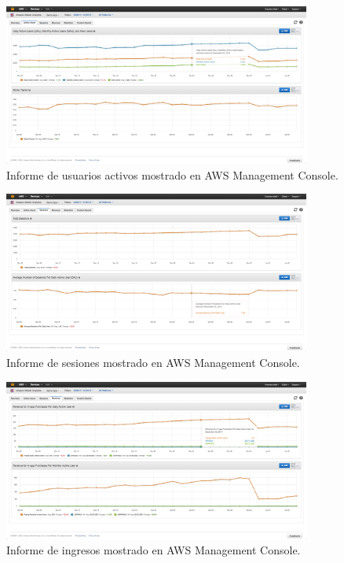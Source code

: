 \documentclass{article}
\begin{document}
\begin{figure}[h]
  \centering
    \includegraphics[width=0.9\textwidth]{img/002_Active_Users.png}
  \caption{Informe de usuarios activos mostrado en AWS  Management Console.}
  \label{fig:ActiveUsers}
\end{figure}

\begin{figure}[h]
  \centering
    \includegraphics[width=0.9\textwidth]{img/003_Sessions.png}
  \caption{Informe de sesiones mostrado en AWS  Management Console.}
  \label{fig:Sessions}
\end{figure}

\begin{figure}[h]
  \centering
    \includegraphics[width=0.9\textwidth]{img/004_Revenue.png}
  \caption{Informe de ingresos mostrado en AWS  Management Console.}
  \label{fig:Revenue}
\end{figure}
\end{document}
